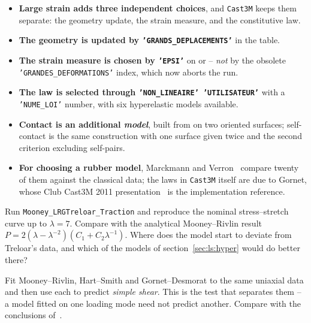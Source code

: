 
\begin{gbox*}
\begin{itemize}
  \item \textbf{Large strain adds three independent choices}, and
  \texttt{Cast3M} keeps them separate: the geometry update, the strain
  measure, and the constitutive law.
  \item \textbf{The geometry is updated by \texttt{'GRANDS\_DEPLACEMENTS'}}
  in the  table.
  \item \textbf{The strain measure is chosen by \texttt{'EPSI'}} on
   or  -- \emph{not} by the obsolete
  \texttt{'GRANDES\_DEFORMATIONS'} index, which now aborts the run.
  \item \textbf{The law is selected through \texttt{'NON\_LINEAIRE'
  'UTILISATEUR'}} with a \texttt{'NUME\_LOI'} number, with six hyperelastic
  models available.
  \item \textbf{Contact is an additional \emph{model}}, built from
   on two oriented surfaces; self-contact is the same
  construction with one surface given twice and the second criterion
   excluding self-pairs.
  \item \textbf{For choosing a rubber model}, Marckmann and
  Verron~\cite{Marckmann:2006} compare twenty of them against the classical
  data; the laws in \texttt{Cast3M} itself are due to Gornet, whose Club
  Cast3M 2011 presentation~\cite{Gornet:club2011} is the implementation
  reference.
\end{itemize}
\end{gbox*}


 Run
  \texttt{Mooney\_LRGTreloar\_Traction} and reproduce the nominal
  stress--stretch curve up to $\lambda=7$. Compare with the analytical
  Mooney--Rivlin result
  $P = 2(\lambda - \lambda^{-2})(C_{1} + C_{2}\lambda^{-1})$. Where does the
  model start to deviate from Treloar's data, and which of the models of
  section~\ref{sec:ls:hyper} would do better there?

 Fit Mooney--Rivlin, Hart--Smith and
  Gornet--Desmorat to the same uniaxial data and then use each to predict
  \emph{simple shear}. This is the test that separates them -- a model fitted
  on one loading mode need not predict another. Compare with the conclusions
  of~\cite{Marckmann:2006}.

